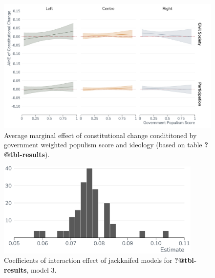 \documentclass[
  abstract]{article}
\begin{document}
\begin{figure}[H]

{\centering \includegraphics{results/graphs/change_effect_appendix.pdf}

}

\caption{\label{fig-interactionapp}Average marginal effect of
constitutional change condititoned by government weighted populism score
and ideology (based on table \textbf{?@tbl-results}).}

\end{figure}

\begin{figure}[H]

{\centering \includegraphics[width=0.9\textwidth,height=\textheight]{results/graphs/jackknife_change.pdf}

}

\caption{\label{fig-jackknifechange}Coefficients of interaction effect
of jackknifed models for \textbf{?@tbl-results}, model 3.}

\end{figure}
\end{document}
